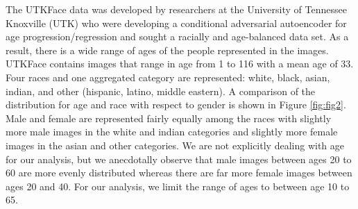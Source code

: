 \documentclass[obeyspaces, spaces, fleqn,10pt]{SelfArx} %
\begin{document}
The UTKFace data was developed by researchers at the University of Tennessee Knoxville (UTK) who were developing a conditional adversarial autoencoder for age progression/regression and sought a racially and age-balanced data set.\cite{utkface} As a result, there is a wide range of ages of the people represented in the images. UTKFace contains images that range in age from 1 to 116 with a mean age of 33. Four races and one aggregated category are represented: white, black, asian, indian, and other (hispanic, latino, middle eastern). A comparison of the distribution for age and race with respect to gender is shown in Figure \ref{fig:fig2}. Male and female are represented fairly equally among the races with slightly more male images in the white and indian categories and slightly more female images in the asian and other categories. We are not explicitly dealing with age for our analysis, but we anecdotally observe that male images between ages 20 to 60 are more evenly distributed whereas there are far more female images between ages 20 and 40. For our analysis, we limit the range of ages to between age 10 to 65. 
\end{document}
